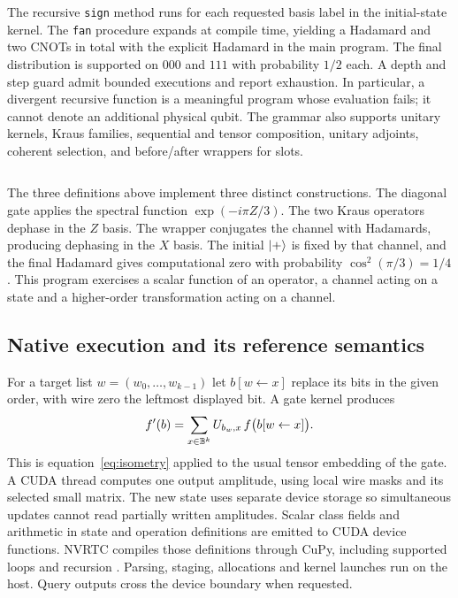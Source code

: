 \inputminted[fontsize=\footnotesize]{qaf}{../../examples/prefix/recursion.qaf}
The recursive \texttt{sign} method runs for each requested basis label in the initial-state kernel. The \texttt{fan} procedure expands at compile time, yielding a Hadamard and two CNOTs in total with the explicit Hadamard in the main program. The final distribution is supported on $000$ and $111$ with probability $1/2$ each. A depth and step guard admit bounded executions and report exhaustion. In particular, a divergent recursive function is a meaningful program whose evaluation fails; it cannot denote an additional physical qubit. The grammar also supports unitary kernels, Kraus families, sequential and tensor composition, unitary adjoints, coherent selection, and before/after wrappers for slots.

\inputminted{qaf}{../../examples/prefix/functions.qaf}
The three definitions above implement three distinct constructions. The diagonal gate applies the spectral function $\exp(-i\pi Z/3)$. The two Kraus operators dephase in the $Z$ basis. The wrapper conjugates the channel with Hadamards, producing dephasing in the $X$ basis. The initial $\lvert +\rangle$ is fixed by that channel, and the final Hadamard gives computational zero with probability $\cos^2(\pi/3)=1/4$. This program exercises a scalar function of an operator, a channel acting on a state and a higher-order transformation acting on a channel.

\subsection{Native execution and its reference semantics}
For a target list $w=(w_0,\ldots,w_{k-1})$ let $b[w\leftarrow x]$ replace its bits in the given order, with wire zero the leftmost displayed bit. A gate kernel produces
\[
 f'(b)=\sum_{x\in\mathbb B^k}U_{b_w,x}\,f\bigl(b[w\leftarrow x]\bigr).
\]
This is equation~\eqref{eq:isometry} applied to the usual tensor embedding of the gate. A CUDA thread computes one output amplitude, using local wire masks and its selected small matrix. The new state uses separate device storage so simultaneous updates cannot read partially written amplitudes. Scalar class fields and arithmetic in state and operation definitions are emitted to CUDA device functions. NVRTC compiles those definitions through CuPy, including supported loops and recursion \cite{cupy}. Parsing, staging, allocations and kernel launches run on the host. Query outputs cross the device boundary when requested.

